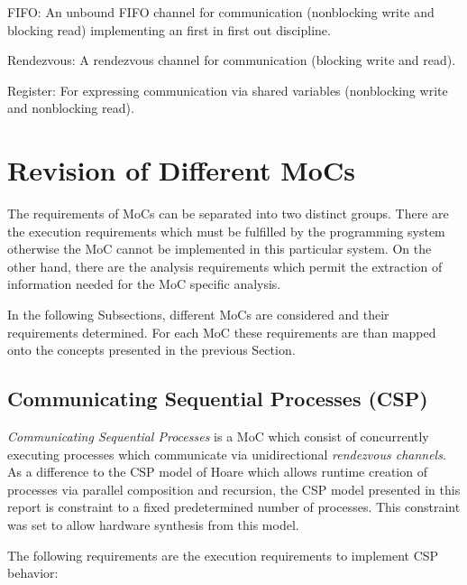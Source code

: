 \begin{concepttype}\label{channel-kind-fifo} FIFO:
  An unbound FIFO channel for communication
  (nonblocking write and blocking read) implementing
  an first in first out discipline.
\end{concepttype}

\begin{concepttype}\label{channel-kind-rendezvous} Rendezvous:
  A rendezvous channel for communication %
  (blocking write and read).
\end{concepttype}

\begin{concepttype}\label{channel-kind-register} Register:
  For expressing communication via shared variables
  (nonblocking write and nonblocking read).
\end{concepttype}

\section{Revision of Different MoCs}\label{revision-of-mocs}

The requirements of MoCs can be separated into two distinct groups.
There are the execution requirements which must be fulfilled by
the programming system otherwise the MoC cannot be implemented in
this particular system.
On the other hand, there are the analysis requirements which
permit the extraction of information needed for the MoC specific analysis.

In the following Subsections, different MoCs are considered and their
requirements determined. For each MoC these requirements are than
mapped onto the concepts presented in the previous Section.

\subsection{Communicating Sequential Processes (CSP)}
\emph{Communicating Sequential Processes} \cite{csphoare:1985}
is a MoC which consist of concurrently executing processes
which communicate via unidirectional \emph{rendezvous channels}.
As a difference to the CSP model of Hoare \cite{csphoare:1985}
which allows runtime creation of processes via parallel
composition and recursion, the CSP model presented in this report
is constraint to a fixed predetermined number of processes.
This constraint was set to allow hardware synthesis from this
model.

The following requirements are the execution requirements to
implement CSP behavior:

